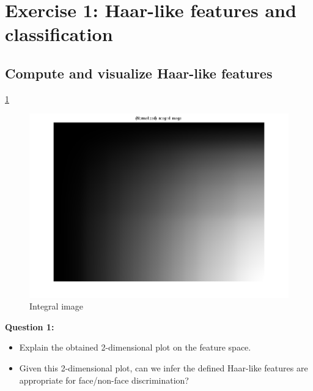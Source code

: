 \section{Exercise 1: Haar-like features and classification}

\subsection{Compute and visualize Haar-like features}

\ref{fig:integralim}

\begin{figure}[htb]
	\centering
		\includegraphics[width=\textwidth]{./img/ex1/integralim.png}
	\caption{Integral image}
	\label{fig:integralim}
\end{figure}

{\bfseries
Question 1:
\begin{itemize}
\item Explain the obtained 2-dimensional plot on the feature space.
\item Given this 2-dimensional plot, can we infer the defined Haar-like features
			are appropriate for face/non-face discrimination?
\end{itemize}}

